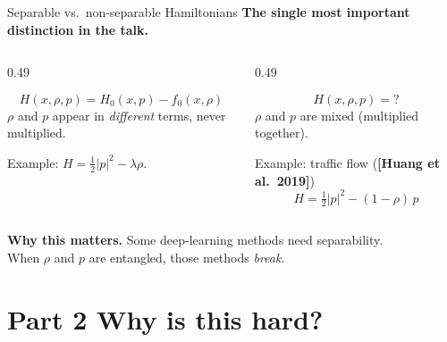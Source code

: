 \documentclass[10pt,aspectratio=169]{beamer}
\newcommand{\teal}[1]{\textcolor{kaustteal}{#1}}
\newcommand{\citehl}[1]{\textcolor{kaustblue!80!black}{\textbf{[#1]}}}
\begin{document}
\begin{frame}{Separable vs.\ non-separable Hamiltonians}
\textbf{The single most important distinction in the talk.}

\medskip
\begin{columns}[T]
\begin{column}{0.49\textwidth}
\begin{tcolorbox}[colback=kaustteal!8, colframe=kaustteal,
                  title={\textbf{Separable}}, fonttitle=\bfseries]
\[
  H(x,\rho,p) = H_0(x,p) - f_0(x,\rho)
\]
\smallskip
$\rho$ and $p$ appear in \emph{different} terms, never multiplied.

\medskip
\teal{Example:} $H = \tfrac12|p|^2 - \lambda\rho$.
\end{tcolorbox}
\end{column}
\begin{column}{0.49\textwidth}
\begin{tcolorbox}[colback=accent!8, colframe=accent,
                  title={\textbf{Non-separable}}, fonttitle=\bfseries]
\[
  H(x,\rho,p) = ?
\]
\smallskip
$\rho$ and $p$ are \alert{mixed} (multiplied together).

\medskip
\alert{Example:} traffic flow (\citehl{Huang et al.\ 2019})
\[
  H = \tfrac12|p|^2 - (1-\rho)\,p
\]
\end{tcolorbox}
\end{column}
\end{columns}

\medskip
\begin{center}
\textbf{Why this matters.}  Some deep-learning methods need separability.\\
When $\rho$ and $p$ are entangled, those methods \emph{break}.
\end{center}
\end{frame}

\section{Part 2 \;\textbar\; Why is this hard?}
\end{document}
